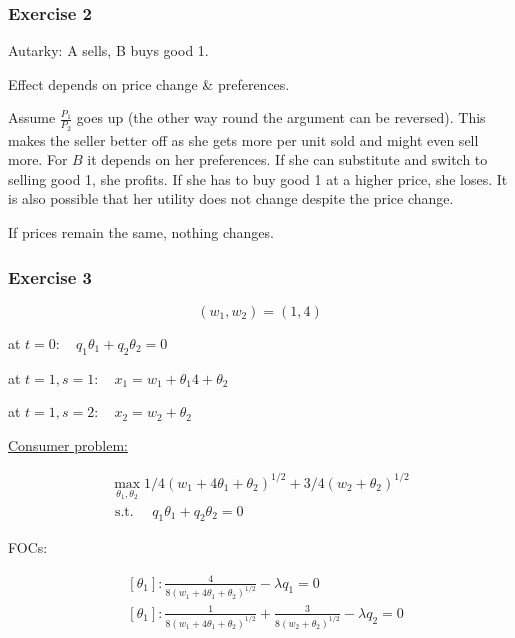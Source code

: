 {{\subsubsection*{Exercise 2}

Autarky: A sells, B buys good 1.

Effect depends on price change \& preferences.

Assume $\frac{P_1}{P_2}$ goes up (the other way round the argument can be reversed).
This makes the seller better off as she gets more per unit sold and might even sell more. For $B$ it depends on her preferences. If she can substitute and switch to selling good 1, she profits. 
If she has to buy good 1 at a higher price, she loses. It is also possible that her utility does not change despite the price change. 

If prices remain the same, nothing changes.
}
{
\subsubsection*{Exercise 3}

$$
\left(w_{1}, w_{2}\right)=(1,4)
$$

\begin{enumerate}[label=(\roman*)]
{\item 
at $t=0: \quad q_{1} \theta_{1}+q_{2} \theta_{2}=0$

at $t=1, s=1: \quad x_{1}=w_{1}+\theta_{1} 4+\theta_{2}$

at $t=1, s=2: \quad x_{2}=w_{2}+\theta_{2}$
}
{
\item 

\underline{Consumer problem:}

$$
\begin{gathered}
\max _{\theta_{1}, \theta_{2}} 1 / 4\left(w_{1}+4 \theta_{1}+\theta_{2}\right)^{1 / 2}+3 / 4\left(w_{2}+\theta_{2}\right)^{1 / 2} \\
\text { s.t. } \quad q_{1} \theta_{1}+q_{2} \theta_{2}=0
\end{gathered}
$$

FOCs:

\begin{align*}
    &\left[\theta_{1} \right]: \frac{4}{8\left(w_{1}+4 \theta_{1}+\theta_{2}\right)^{1 / 2}}-\lambda q_{1}=0 \\
    &\left[\theta_{1} \right]: \frac{1}{8\left(w_{1}+4 \theta_{1}+\theta_{2}\right)^{1 / 2}}+\frac{3}{8\left(w_{2}+\theta_{2}\right)^{1 / 2}}-\lambda q_{2}=0
\end{align*}

}
\end{enumerate}}}

